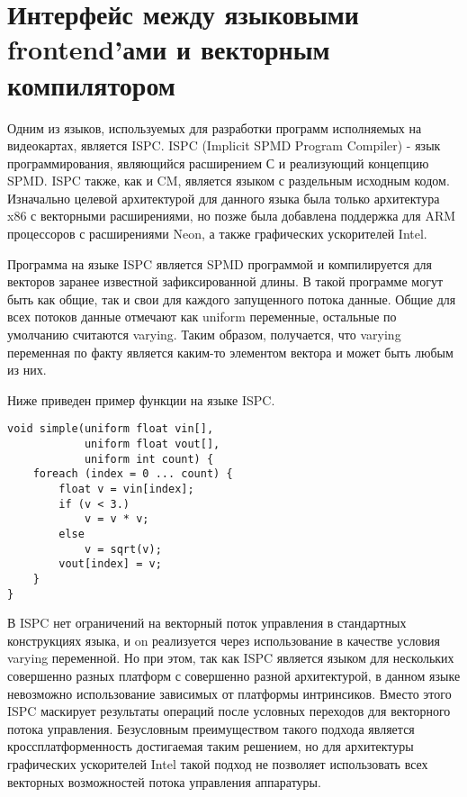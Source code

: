 \section{Интерфейс между языковыми frontend'ами и векторным компилятором}
\label{sec:Interface}

Одним из языков, используемых для разработки программ исполняемых на
видеокартах, является ISPC. ISPC (Implicit SPMD Program Compiler) - язык программирования, являющийся
расширением С и реализующий концепцию SPMD. ISPC также, как и CM, является
языком с раздельным исходным кодом. Изначально целевой архитектурой для данного
языка была только архитектура x86 с векторными расширениями, но позже была
добавлена поддержка для ARM процессоров с расширениями Neon, а также
графических ускорителей Intel.

Программа на языке ISPC является SPMD программой и компилируется для векторов
заранее известной зафиксированной длины. В такой программе могут быть как общие,
так и свои для каждого запущенного потока данные. Общие для всех потоков данные
отмечают как uniform переменные, остальные по умолчанию считаются varying. Таким
образом, получается, что varying переменная по факту является каким-то элементом
вектора и может быть любым из них.

Ниже приведен пример функции на языке ISPC.

\begin{verbatim}
void simple(uniform float vin[],
            uniform float vout[],
            uniform int count) {
    foreach (index = 0 ... count) {
        float v = vin[index];
        if (v < 3.)
            v = v * v;
        else
            v = sqrt(v);
        vout[index] = v;
    }
}
\end{verbatim}

В ISPC нет ограничений на векторный поток управления в
стандартных конструкциях языка, и on реализуется через использование в качестве
условия varying переменной. Но при этом, так как ISPC является языком для
нескольких совершенно разных платформ с совершенно разной архитектурой, в данном
языке невозможно использование зависимых от платформы интринсиков. Вместо этого
ISPC маскирует результаты операций после условных переходов для векторного потока
управления. Безусловным преимуществом такого подхода является
кроссплатформенность достигаемая таким решением, но для архитектуры графических
ускорителей Intel такой подход не позволяет использовать всех векторных
возможностей потока управления аппаратуры.

